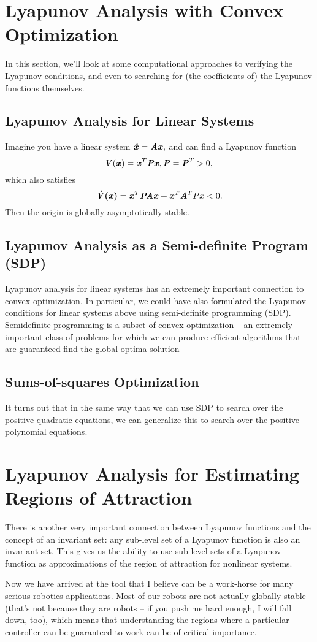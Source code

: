 \section{Lyapunov Analysis with Convex Optimization}
In this section, we'll look at some computational approaches to verifying the Lyapunov conditions, and even to searching for (the coefficients of) the Lyapunov functions themselves.
\subsection{Lyapunov Analysis for Linear Systems}
Imagine you have a linear system
$\bm{\mathit{\dot{x}}}=\bm{\mathit{Ax}},$
and can find a Lyapunov function
$$V(\bm{\mathit{x}})=\bm{\mathit{x}}^T\bm{\mathit{Px}}, \bm{\mathit{P}}=\bm{\mathit{P}}^T>0,$$
which also satisfies
$$\bm{\mathit{\dot{V}(x)}}=\bm{\mathit{x}}^T\bm{\mathit{PAx}}+\bm{\mathit{x}}^T\bm{\mathit{A}}^TPx<0.$$
Then the origin is globally asymptotically stable.

\subsection{Lyapunov Analysis as a Semi-definite Program (SDP)}
Lyapunov analysis for linear systems has an extremely important connection to convex optimization. In particular, we could have also formulated the Lyapunov conditions for linear systems above using semi-definite programming (SDP). Semidefinite programming is a subset of convex optimization -- an extremely important class of problems for which we can produce efficient algorithms that are guaranteed find the global optima solution 
\subsection{Sums-of-squares Optimization}
It turns out that in the same way that we can use SDP to search over the positive quadratic equations, we can generalize this to search over the positive polynomial equations.


\section{Lyapunov Analysis for Estimating Regions of Attraction}
There is another very important connection between Lyapunov functions and the concept of an invariant set: any sub-level set of a Lyapunov function is also an invariant set. This gives us the ability to use sub-level sets of a Lyapunov function as approximations of the region of attraction for nonlinear systems.

Now we have arrived at the tool that I believe can be a work-horse for many serious robotics applications. Most of our robots are not actually globally stable (that's not because they are robots -- if you push me hard enough, I will fall down, too), which means that understanding the regions where a particular controller can be guaranteed to work can be of critical importance.

